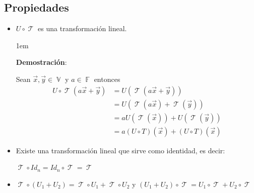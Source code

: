 \documentclass[12pt, fleqn]{report}                             %
\newenvironment{SmallIndentation}[1][0.75em]                    %
        {\begin{adjustwidth}{#1}{}\begin{footnotesize}}             %
        {\end{footnotesize}\end{adjustwidth}}                       %
\theoremstyle{break}                                            %
\DeclareMathOperator \GenericField {\mathbb{F}}                 %
\DeclareMathOperator \VectorSet    {\mathbb{V}}                 %
\DeclareMathOperator \LinTrans {\mathcal{T}}                    %
\begin{document}
            \subsection{Propiedades}

                \begin{itemize}
                    \item 
                        $U \circ \LinTrans$ es una transformación lineal.

                        \begin{SmallIndentation}[1em]
                            \textbf{Demostración}:
                            
                            Sean $\vec x, \vec y \in \VectorSet$ y $a \in \GenericField$ entonces
                            \begin{align*}
                                U \circ \LinTrans(a\vec x + \vec y)
                                    &= U(\LinTrans(a\vec x + \vec y))                   \\
                                    &= U(\LinTrans(a\vec x) + \LinTrans(\vec y))        \\
                                    &= aU(\LinTrans(\vec x)) + U(\LinTrans(\vec y))     \\
                                    &= a (U \circ T)(\vec x) + (U \circ T)(\vec x)
                            \end{align*}
                        
                        \end{SmallIndentation}

                    \item 
                        Existe una transformación lineal que sirve como identidad, es decir:

                        $\LinTrans \circ Id_n = Id_n \circ \LinTrans = \LinTrans$

                    \item 
                        $\LinTrans \circ (U_1 + U_2) = \LinTrans \circ U_1 + \LinTrans \circ U_2$
                        y 
                        $(U_1 + U_2) \circ \LinTrans = U_1 \circ \LinTrans + U_2 \circ \LinTrans$


\end{itemize}
\end{document}
